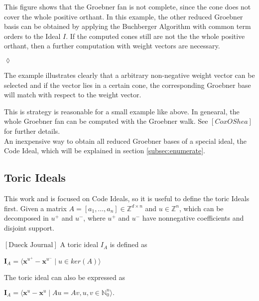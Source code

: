 \begin{env_example}
This figure shows that the Groebner fan is not complete, since the cone does not cover the whole positive orthant. In this example, the other reduced Groebner basis can be obtained by applying the Buchberger Algorithm with common term orders to the Ideal $I$.
If the computed cones still are not the the whole positive orthant, then a further computation with weight vectors are necessary.

\begin{flushright}
$\lozenge$
\end{flushright} 
\end{env_example}

The example illustrates clearly that a arbitrary non-negative weight vector can be selected and if the vector lies in a certain cone, the corresponding Groebner base will match with respect to the weight vector.  


This is strategy is reasonable for a small example like above.
In genearal, the whole Groebner fan can be computed with the Groebner walk.
See $\left[ Cox OShea \right]$ for further details.\\
An inexpensive way to obtain all reduced Groebner bases of a special ideal, the Code Ideal, which will be explained in section \ref{subsec:enumerate}.

\subsection{Toric Ideals}
\label{subsec:toric}
This work and is focused on Code Ideals, so it is useful to define the toric Ideals first. Given a matrix $A =\left[a_{1},\dots, a_{n}  \right] \in \mathbb{Z}^{d \times n } $ and $u \in \mathbb{Z}^{n}$, which can be decomposed in $u^{+} $ and $u^{-}$, where $u^{+} $ and $u^{-}$ have nonnegative coefficients and disjoint support.

\begin{env_definition}
$\left[ \textrm{Dueck Journal} \right] $ A toric ideal $I_{A}$ is defined as
\begin{center}
$ \textbf{I}_{A} = \langle \textbf{x}^{u^{+}} - \textbf{x}^{u^{-}} \mid u \in ker \left(  A \right) \rangle  $
\end{center}


\end{env_definition}

The toric ideal can also be expressed as
\begin{center}
$ \textbf{I}_{A} =  \langle \textbf{x}^{u} - \textbf{x}^{u} \mid Au = Av, u,v \in \mathbb{N}^{n}_{0} \rangle .$
\end{center}

